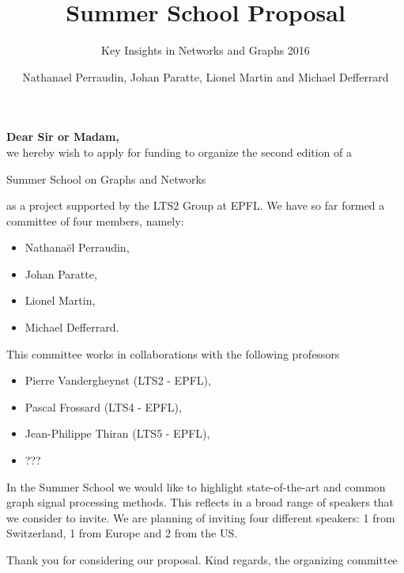 \documentclass[a4paper]{scrartcl}
\begin{document}
\title{Summer School Proposal}
\subtitle{Key Insights in Networks and Graphs 2016}

\author{Nathanael Perraudin, Johan Paratte, Lionel Martin and Michael Defferrard}

\maketitle



\vspace{2cm}


{\bf{Dear Sir or Madam,}} \\
we hereby wish to apply for funding to organize the second edition of a
\begin{large}
\begin{center}
Summer School on Graphs and Networks
\end{center}
\end{large}
as a project supported by the LTS2 Group at EPFL. We have so far formed a committee of four members, namely:
\begin{itemize}
	\item Nathanaël Perraudin,
	\item Johan Paratte, 
	\item Lionel Martin,
	\item Michael Defferrard.
\end{itemize}

This committee works in collaborations with the following professors
\begin{itemize}
	\item Pierre Vandergheynst (LTS2 - EPFL),
	\item Pascal Frossard (LTS4 - EPFL),
	\item Jean-Philippe Thiran (LTS5 - EPFL),
	\item ???
\end{itemize}

In the Summer School we would like to highlight state-of-the-art and common graph signal processing methods. This reflects in a broad range of speakers that we consider to invite. We are planning of inviting four different speakers: 1 from Switzerland, 1 from Europe and 2 from the US.

\vspace{0.5cm}

Thank you for considering our proposal. Kind regards, the organizing committee
\end{document}
